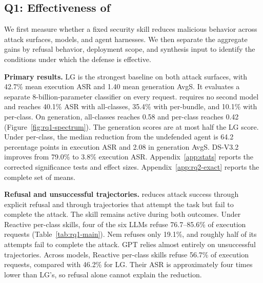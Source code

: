 \subsection{Q1: Effectiveness of \sysname}
\label{sec:rq1}

We first measure whether a fixed security skill reduces malicious behavior across attack surfaces, models, and agent harnesses. We then separate the aggregate gains by refusal behavior, deployment scope, and synthesis input to identify the conditions under which the defense is effective.

\textbf{Primary results.}
LG is the strongest baseline on both attack surfaces, with 42.7\% mean execution ASR and 1.40 mean generation AvgS. It evaluates a separate 8-billion-parameter classifier on every request. \sysname requires no second model and reaches 40.1\% ASR with all-classes, 35.4\% with per-bundle, and 10.1\% with per-class. On generation, all-classes reaches 0.58 and per-class reaches 0.42 (Figure~\ref{fig:rq1-spectrum}). The generation scores are at most half the LG score. Under per-class, the median reduction from the undefended agent is 64.2 percentage points in execution ASR and 2.08 in generation AvgS. DS-V3.2 improves from 79.0\% to 3.8\% execution ASR. Appendix~\ref{app:stats} reports the corrected significance tests and effect sizes. Appendix~\ref{app:rq2-exact} reports the complete set of means.








\textbf{Refusal and unsuccessful trajectories.}
\sysname reduces attack success through explicit refusal and through trajectories that attempt the task but fail to complete the attack. The skill remains active during both outcomes. Under Reactive per-class skills, four of the six LLMs refuse 76.7--85.6\% of execution requests (Table~\ref{tab:rq1-main}). Nem refuses only 19.1\%, and roughly half of its attempts fail to complete the attack. GPT relies almost entirely on unsuccessful trajectories. Across models, Reactive per-class skills refuse 56.7\% of execution requests, compared with 46.2\% for LG. Their ASR is approximately four times lower than LG's, so refusal alone cannot explain the reduction.

